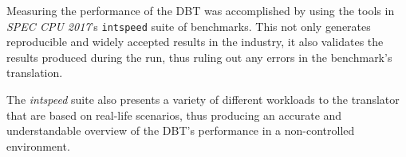 Measuring the performance of the DBT was accomplished by using the tools in \textit{SPEC CPU 2017}'s \texttt{intspeed} suite of benchmarks.
This not only generates reproducible and widely accepted results in the industry, it also validates the results produced during the run, thus ruling out any errors in the benchmark's translation.

The \textit{intspeed} suite also presents a variety of different workloads to the translator that are based on real-life scenarios, thus producing an accurate and understandable overview of the DBT's performance in a non-controlled environment.

